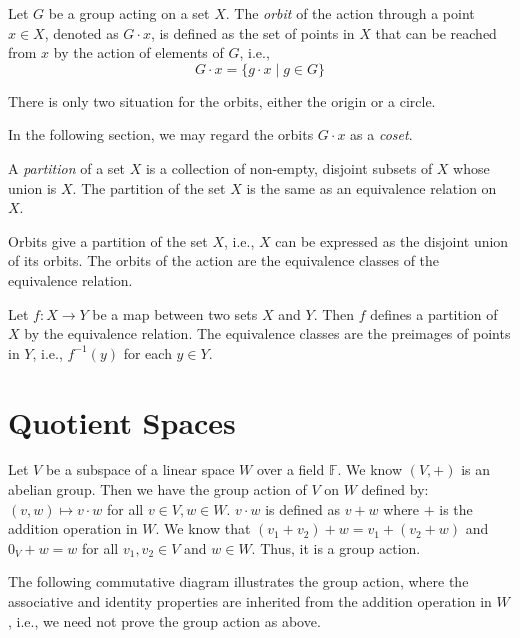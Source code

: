 \documentclass[
	11pt, %
	fleqn, %
	a4paper, %
]{LegrandOrangeBook}
\newcommand{\F}{\mathbb{F}} %
\begin{document}
\begin{definition}[Orbits]
    Let $G$ be a group acting on a set $X$. The \emph{orbit} of the action through a point $x \in X$, denoted as $G \cdot x$, is defined as the set of points in $X$ that can be reached from $x$ by the action of elements of $G$, i.e., 
    \[
        G \cdot x = \{g \cdot x \mid g \in G\}
    \]
\end{definition}

There is only two situation for the orbits, either the origin or a circle.

In the following section, we may regard the orbits $G \cdot x$ as a \emph{coset}.

\begin{definition}[Partition]
    A \emph{partition} of a set $X$ is a collection of non-empty, disjoint subsets of $X$ whose union is $X$. The partition of the set $X$ is the same as an equivalence relation on $X$.
\end{definition}

Orbits give a partition of the set $X$, i.e., $X$ can be expressed as the disjoint union of its orbits. The orbits of the action are the equivalence classes of the equivalence relation.

Let $f : X \to Y$ be a map between two sets $X$ and $Y$. Then $f$ defines a partition of $X$ by the equivalence relation. The equivalence classes are the preimages of points in $Y$, i.e., $f^{-1}(y)$ for each $y \in Y$.

\newpage

\section{Quotient Spaces}

Let $V$ be a subspace of a linear space $W$ over a field $\F$. We know $(V, +)$ is an abelian group. Then we have the group action of $V$ on $W$ defined by: $(v, w) \mapsto v \cdot w$ for all $v \in V, w \in W$. $v \cdot w$ is defined as $v + w$ where $+$ is the addition operation in $W$.
We know that $(v_1 + v_2) + w = v_1 + (v_2 + w)$ and $0_V + w = w$ for all $v_1, v_2 \in V$ and $w \in W$. Thus, it is a group action. 

The following commutative diagram illustrates the group action, where the associative and identity properties are inherited from the addition operation in $W$, i.e., we need not prove the group action as above.

\begin{center}
\end{center}
\end{document}
